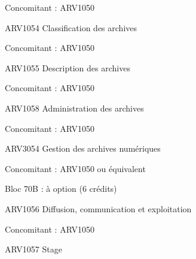 \documentclass [12 pt]{article}
\begin{document}
                            
                                Concomitant : ARV1050
                            
                        
                        
                            
                                ARV1054 Classification des archives
                            
                            
                                Concomitant : ARV1050
                            
                        
                        
                            
                                ARV1055 Description des archives
                            
                            
                                Concomitant : ARV1050
                            
                        
                        
                            
                                ARV1058 Administration des archives
                            
                            
                                Concomitant : ARV1050
                            
                        
                        
                            
                                ARV3054 Gestion des archives numériques
                            
                            
                                Concomitant : ARV1050 ou équivalent
                            
                        
                        
                            
                                Bloc 70B : à option (6 crédits)
                            
                        
                        
                            
                                ARV1056 Diffusion, communication et exploitation
                            
                            
                                Concomitant : ARV1050
                            
                        
                        
                            
                                ARV1057 Stage
                            
\end{document}
